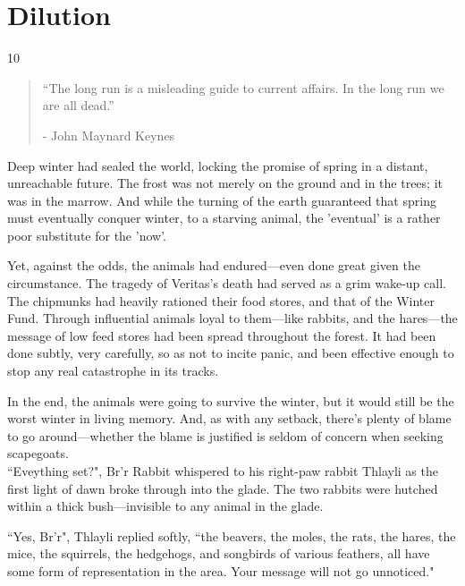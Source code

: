 \chapter{Dilution}

\vspace{-1.3cm}
\begin{localsize}{10}
    \begin{quote}
        “The long run is a misleading guide to current affairs. In the long run we are all dead.”
        \begin{flushright}- John Maynard Keynes \end{flushright}
    \end{quote}
\end{localsize}
\vspace{1cm}

Deep winter had sealed the world, locking the promise of spring in a distant, unreachable future. The frost was not merely on the ground and in the trees; it was in the marrow. And while the turning of the earth guaranteed that spring must eventually conquer winter, to a starving animal, the 'eventual' is a rather poor substitute for the 'now'.

Yet, against the odds, the animals had endured---even done great given the circumstance. The tragedy of Veritas's death had served as a grim wake-up call. The chipmunks had heavily rationed their food stores, and that of the Winter Fund. Through influential animals loyal to them---like rabbits, and the hares---the message of low feed stores had been spread throughout the forest. It had been done subtly, very carefully, so as not to incite panic, and been effective enough to stop any real catastrophe in its tracks.

In the end, the animals were going to survive the winter, but it would still be the worst winter in living memory. And, as with any setback, there's plenty of blame to go around---whether the blame is justified is seldom of concern when seeking scapegoats.\\

``Eveything set?", Br'r Rabbit whispered to his right-paw rabbit Thlayli as the first light of dawn broke through into the glade. The two rabbits were hutched within a thick bush---invisible to any animal in the glade.

``Yes, Br'r", Thlayli replied softly, ``the beavers, the moles, the rats, the hares, the mice, the squirrels, the hedgehogs, and songbirds of various feathers, all have some form of representation in the area. Your message will not go unnoticed."

